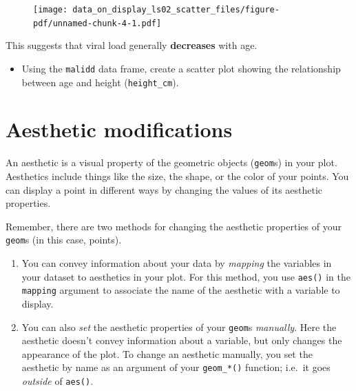 \documentclass[
  letterpaper,
  DIV=11,
  numbers=noendperiod]{scrreprt}
\providecommand{\tightlist}{%
  \setlength{\itemsep}{0pt}\setlength{\parskip}{0pt}}\usepackage{longtable,booktabs,array}
\begin{document}
\begin{figure}[H]

{\centering \texttt{[image: data\_on\_display\_ls02\_scatter\_files/figure-pdf/unnamed-chunk-4-1.pdf]}

}

\end{figure}

This suggests that viral load generally \textbf{decreases} with age.

\begin{tcolorbox}[enhanced jigsaw, colframe=quarto-callout-tip-color-frame, rightrule=.15mm, opacityback=0, breakable, coltitle=black, colbacktitle=quarto-callout-tip-color!10!white, bottomrule=.15mm, leftrule=.75mm, toprule=.15mm, arc=.35mm, bottomtitle=1mm, colback=white, left=2mm, opacitybacktitle=0.6, titlerule=0mm, title=\textcolor{quarto-callout-tip-color}{\faLightbulb}\hspace{0.5em}{Practice}, toptitle=1mm]

\begin{itemize}
\tightlist
\item
  Using the \texttt{malidd} data frame, create a scatter plot showing
  the relationship between age and height (\texttt{height\_cm}).
\end{itemize}

\end{tcolorbox}

\hypertarget{aesthetic-modifications}{%
\section{Aesthetic modifications}\label{aesthetic-modifications}}

An aesthetic is a visual property of the geometric objects
(\texttt{geom}s) in your plot. Aesthetics include things like the size,
the shape, or the color of your points. You can display a point in
different ways by changing the values of its aesthetic properties.

Remember, there are two methods for changing the aesthetic properties of
your \texttt{geom}s (in this case, points).

\begin{enumerate}
\def\labelenumi{\arabic{enumi}.}
\item
  You can convey information about your data by \emph{mapping} the
  variables in your dataset to aesthetics in your plot. For this method,
  you use \texttt{aes()} in the \texttt{mapping} argument to associate
  the name of the aesthetic with a variable to display.
\item
  You can also \emph{set} the aesthetic properties of your
  \texttt{geom}s \emph{manually}. Here the aesthetic doesn't convey
  information about a variable, but only changes the appearance of the
  plot. To change an aesthetic manually, you set the aesthetic by name
  as an argument of your \texttt{geom\_*()} function; i.e.~it goes
  \emph{outside} of \texttt{aes()}.
\end{enumerate}
\end{document}
